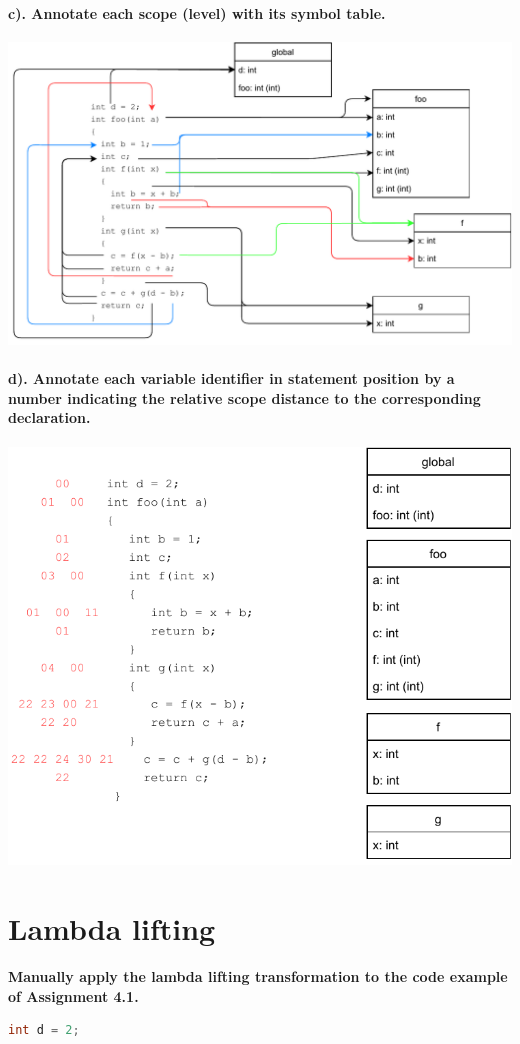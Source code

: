 \documentclass[hidelinks]{uva-inf-article}
\begin{document}
\begin{flushleft}
\paragraph{c). Annotate each scope (level) with its symbol table.\\}
\includegraphics[width=14cm]{images/1c.pdf}
\newpage
\paragraph{d). Annotate each variable identifier in statement position by a number indicating the relative scope distance to the corresponding declaration.\\}
\includegraphics[width=14cm]{images/1d.pdf}
\newpage
\section{Lambda lifting}
\textbf{Manually apply the lambda lifting transformation to the code example of Assignment 4.1.} 
\begin{lstlisting}[basicstyle=\small, language=C]
int d = 2;


\end{lstlisting}
\end{flushleft}
\end{document}
